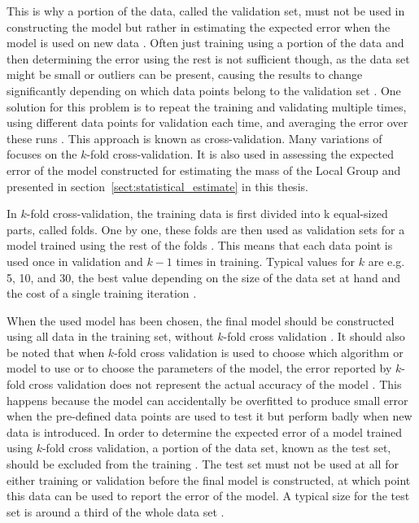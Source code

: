\documentclass[english, twoside]{HYgradu}
\begin{document}
This is why a portion of the data, called the validation set, must not be used in constructing the model but rather in estimating the expected error when the model is used on new data \citep{alpaydin2014introduction}. Often just training using a portion of the data and then determining the error using the rest is not sufficient though, as the data set might be small or outliers can be present, causing the results to change significantly depending on which data points belong to the validation set \citep{alpaydin2014introduction}. One solution for this problem is to repeat the training and validating multiple times, using different data points for validation each time, and averaging the error over these runs \citep{alpaydin2014introduction}. This approach is known as cross-validation. Many variations of focuses on the $k$-fold cross-validation. It is also used in assessing the expected error of the model constructed for estimating the mass of the Local Group and presented in section~\ref{sect:statistical_estimate} in this thesis.

In $k$-fold cross-validation, the training data is first divided into k equal-sized parts, called folds. One by one, these folds are then used as validation sets for a model trained using the rest of the folds \citep{alpaydin2014introduction, murphy2012machine}. This means that each data point is used once in validation and $k-1$ times in training. Typical values for $k$ are e.g. 5, 10, and 30, the best value depending on the size of the data set at hand and the cost of a single training iteration \citep{alpaydin2014introduction, murphy2012machine}.

When the used model has been chosen, the final model should be constructed using all data in the training set, without $k$-fold cross validation \citep{alpaydin2014introduction}. It should also be noted that when $k$-fold cross validation is used to choose which algorithm or model to use or to choose the parameters of the model, the error reported by $k$-fold cross validation does not represent the actual accuracy of the model \citep{alpaydin2014introduction}. This happens because the model can accidentally be overfitted to produce small error when the pre-defined data points are used to test it but perform badly when new data is introduced. In order to determine the expected error of a model trained using $k$-fold cross validation, a portion of the data set, known as the test set, should be excluded from the training \citep{alpaydin2014introduction}. The test set must not be used at all for either training or validation before the final model is constructed, at which point this data can be used to report the error of the model. A typical size for the test set is around a third of the whole data set \citep{alpaydin2014introduction}.
\end{document}

